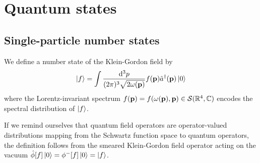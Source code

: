 \section{Quantum states}

\subsection{Single-particle number states}

\begin{definition}\label{def:single_particle_number_state}
	We define a number state of the Klein-Gordon field by
	\begin{equation}
		\ket{f}
		=
		\int\frac{\dd[3]{p}}{(2\pi)^3\sqrt{2\omega(\vb{p})}}
		f(\vb{p})
		\hat{a}^\dagger(\vb{p})
		\ket{0}
	\end{equation}
	where the Lorentz-invariant spectrum $f(\vb{p})=f(\omega(\vb{p}),\vb{p})\in\mathcal{S}(\mathbb{R}^4,\mathbb{C})$ encodes the spectral distribution of $\ket{f}$.
\end{definition}
\begin{remark}
	If we remind ourselves that quantum field operators are operator-valued distributions mapping from the Schwartz function space to quantum operators, the definition follows from the smeared Klein-Gordon field operator acting on the vacuum $\hat\phi[f]\ket{0}=\phi^-[f]\ket{0}=\ket{f}$.
\end{remark}

